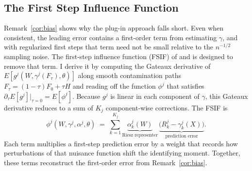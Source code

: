 \subsection{The First Step Influence Function}\label{sec:3b}

Remark~\ref{cor:bias} shows why the plug-in approach falls short. Even when consistent, the leading error contains a first-order term from estimating $\gamma$, and with regularized first steps that term need not be small relative to the $n^{-1/2}$ sampling noise. The first-step influence function (FSIF) of \citet{ichimura2022influence} and \citet{chernozhukov2022locally} is designed to remove that term. I derive it by computing the Gateaux derivative of $E[g^j(W,\gamma^j(F_\tau),\theta)]$ along smooth contamination paths $F_\tau = (1-\tau)F_0 + \tau H$ and reading off the function $\phi^j$ that satisfies $\partial_\tau E[g^j]\big|_{\tau=0} = E[\phi^j]$. Because $g^j$ is linear in each component of $\gamma$, this Gateaux derivative reduces to a sum of $K_j$ component-wise corrections. The FSIF is
\begin{equation}\label{eq:fsif_decomp}
    \phi^{j}(W,\gamma^j,\alpha^j,\theta)
    \;=\;
    \sum_{k=1}^{K_j}
    \underbrace{\alpha^{j}_k(W)}_{\text{Riesz representer}}\,
    \underbrace{\bigl(R^{j}_k-\gamma^{j}_k(X)\bigr)}_{\text{prediction error}}.
\end{equation}
Each term multiplies a first-step prediction error by a weight that records how perturbations of that nuisance function shift the identifying moment. Together, these terms reconstruct the first-order error from Remark~\ref{cor:bias}.

